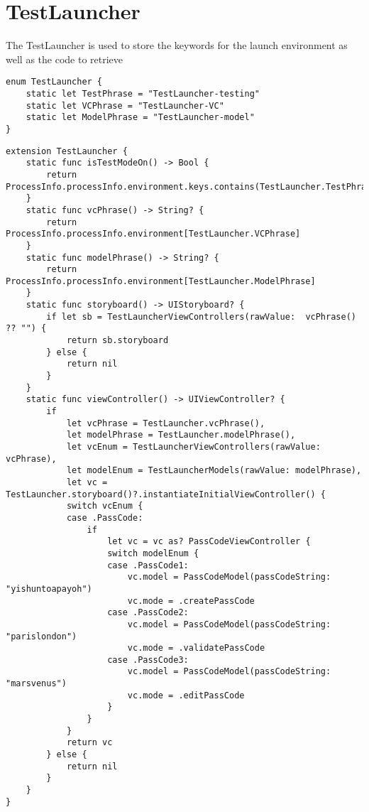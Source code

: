 \documentclass[10pt]{article}
\begin{document}
\section{TestLauncher}

The TestLauncher is used to store the keywords for the launch environment as well as the code to retrieve 

\begin{verbatim}
enum TestLauncher {
    static let TestPhrase = "TestLauncher-testing"
    static let VCPhrase = "TestLauncher-VC"
    static let ModelPhrase = "TestLauncher-model"
}
\end{verbatim}

\begin{verbatim}
extension TestLauncher {
    static func isTestModeOn() -> Bool {
        return ProcessInfo.processInfo.environment.keys.contains(TestLauncher.TestPhrase)
    }
    static func vcPhrase() -> String? {
        return ProcessInfo.processInfo.environment[TestLauncher.VCPhrase]
    }
    static func modelPhrase() -> String? {
        return ProcessInfo.processInfo.environment[TestLauncher.ModelPhrase]
    }
    static func storyboard() -> UIStoryboard? {
        if let sb = TestLauncherViewControllers(rawValue:  vcPhrase() ?? "") {
            return sb.storyboard
        } else {
            return nil
        }
    }
    static func viewController() -> UIViewController? {
        if
            let vcPhrase = TestLauncher.vcPhrase(),
            let modelPhrase = TestLauncher.modelPhrase(),
            let vcEnum = TestLauncherViewControllers(rawValue: vcPhrase),
            let modelEnum = TestLauncherModels(rawValue: modelPhrase),
            let vc = TestLauncher.storyboard()?.instantiateInitialViewController() {
            switch vcEnum {
            case .PassCode:
                if
                    let vc = vc as? PassCodeViewController {
                    switch modelEnum {
                    case .PassCode1:
                        vc.model = PassCodeModel(passCodeString: "yishuntoapayoh")
                        vc.mode = .createPassCode
                    case .PassCode2:
                        vc.model = PassCodeModel(passCodeString: "parislondon")
                        vc.mode = .validatePassCode
                    case .PassCode3:
                        vc.model = PassCodeModel(passCodeString: "marsvenus")
                        vc.mode = .editPassCode
                    }
                }
            }
            return vc
        } else {
            return nil
        }
    }
}
\end{verbatim}
\end{document}
